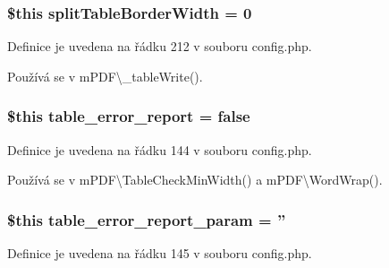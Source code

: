 \hypertarget{config_8php_ae64dbc8f53f7cf4c58f7ad2b5dde6d50}{
\subsubsection[{split\-Table\-Border\-Width}]{\setlength{\rightskip}{0pt plus 5cm}\$this split\-Table\-Border\-Width = 0}}\label{config_8php_ae64dbc8f53f7cf4c58f7ad2b5dde6d50}


Definice je uvedena na řádku 212 v souboru config.\-php.



Používá se v m\-P\-D\-F\textbackslash{}\-\_\-table\-Write().

\hypertarget{config_8php_a51cbc0936934d03ee2b092267f070d41}{
\subsubsection[{table\-\_\-error\-\_\-report}]{\setlength{\rightskip}{0pt plus 5cm}\$this table\-\_\-error\-\_\-report = {\bf false}}}\label{config_8php_a51cbc0936934d03ee2b092267f070d41}


Definice je uvedena na řádku 144 v souboru config.\-php.



Používá se v m\-P\-D\-F\textbackslash{}\-Table\-Check\-Min\-Width() a m\-P\-D\-F\textbackslash{}\-Word\-Wrap().

\hypertarget{config_8php_af297f55f803a30da5f7e85adbe55a7fa}{
\subsubsection[{table\-\_\-error\-\_\-report\-\_\-param}]{\setlength{\rightskip}{0pt plus 5cm}\$this table\-\_\-error\-\_\-report\-\_\-param = ''}}\label{config_8php_af297f55f803a30da5f7e85adbe55a7fa}


Definice je uvedena na řádku 145 v souboru config.\-php.



